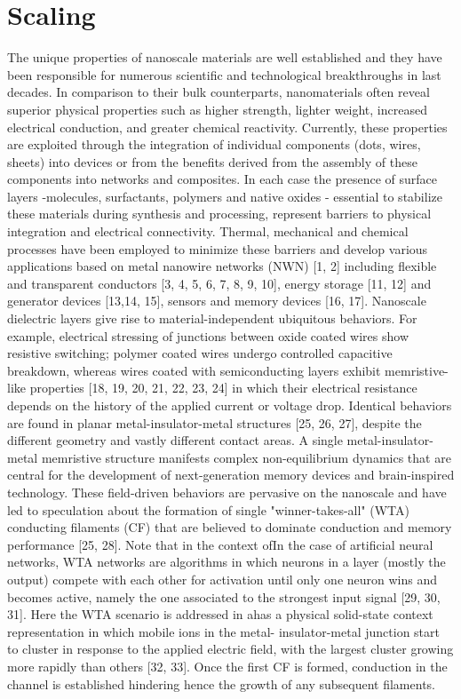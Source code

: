 \section{Scaling}
The unique properties of nanoscale materials are well established and they have been responsible for numerous scientific and technological breakthroughs in last decades. In comparison to their bulk counterparts, nanomaterials often reveal superior physical properties such as higher strength, lighter weight, increased electrical conduction, and greater chemical reactivity. Currently, these properties are exploited through the integration of individual components (dots, wires, sheets) into devices or from the benefits derived from the assembly of these components into networks and composites. In each case the presence of surface layers -molecules, surfactants, polymers and native oxides - essential to stabilize these materials during synthesis and processing, represent barriers to physical integration and electrical connectivity. Thermal, mechanical and chemical processes have been employed to minimize these barriers and develop various applications based on metal nanowire networks (NWN) [1, 2] including flexible and transparent conductors [3, 4, 5, 6, 7, 8, 9, 10], energy storage [11, 12] and generator devices [13,14, 15], sensors and memory devices [16, 17]. Nanoscale dielectric layers give rise to material-independent ubiquitous behaviors. For example, electrical stressing of junctions between oxide coated wires show resistive switching; polymer coated wires undergo controlled capacitive breakdown, whereas wires coated with semiconducting layers exhibit memristive-like properties [18, 19, 20, 21, 22, 23, 24] in which their electrical resistance depends on the history of the applied current or voltage drop. Identical behaviors are found in planar metal-insulator-metal structures [25, 26, 27], despite the different geometry and vastly different contact areas. A single metal-insulator-metal memristive structure manifests complex non-equilibrium dynamics that are central for the development of next-generation memory devices and brain-inspired technology. These field-driven behaviors are pervasive on the nanoscale and have led to speculation about the formation of single "winner-takes-all" (WTA) conducting filaments (CF) that are believed to dominate conduction and memory performance [25, 28]. Note that in the context ofIn the case of artificial neural networks, WTA networks are algorithms in which neurons in a layer (mostly the output) compete with each other for activation until only one neuron wins and becomes active, namely the one associated to the strongest input signal [29, 30, 31]. Here the WTA scenario is addressed in ahas a physical solid-state context representation in which mobile ions in the metal- insulator-metal junction start to cluster in response to the applied electric field, with the largest cluster growing more rapidly than others [32, 33]. Once the first CF is formed, conduction in the channel is established hindering hence the growth of any subsequent filaments.

